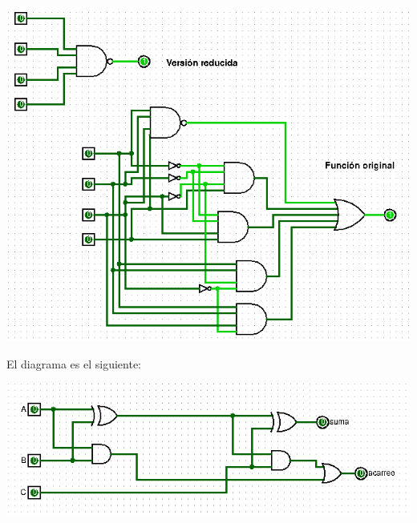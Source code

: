 \documentclass[answers]{exam}
\begin{document}
\begin{questions}
\begin{solution}
\begin{itemize}
\begin{center}
              \includegraphics[scale=0.7]{ejercicio5.b}
            \end{center}
    \end{itemize}
  \end{solution}

  \begin{solution}
    El diagrama es el siguiente:
    \begin{center}
      \includegraphics[width=\linewidth]{ejercicio6}
    \end{center}
  \end{solution}


\end{questions}
\end{document}
